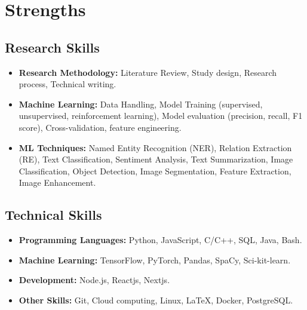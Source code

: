 \section{Strengths}
\vspace{0.3cm}

\subsection{Research Skills}

\begin{itemize}[leftmargin=.3in]
\setlength\itemsep{.1em}
    \item \textbf{Research Methodology:} Literature Review, Study design, Research process, Technical writing.

    \item \textbf{Machine Learning:} Data Handling, Model Training (supervised, unsupervised, reinforcement learning), Model evaluation (precision, recall, F1 score), Cross-validation, feature engineering.\textbf{}
    
    \item \textbf{ML Techniques:} Named Entity Recognition (NER), Relation Extraction (RE), Text Classification, Sentiment Analysis, Text Summarization, Image Classification, Object Detection, Image Segmentation, Feature Extraction, Image Enhancement.
    




    
\end{itemize}


\subsection{Technical Skills}

\begin{itemize}[leftmargin=.3in]
\setlength\itemsep{.1em}
    \item \textbf{Programming Languages:} Python, JavaScript, C/C++, SQL, Java, Bash.

    \item \textbf{Machine Learning:} TensorFlow, PyTorch, Pandas, SpaCy, Sci-kit-learn.
    
    \item \textbf{Development: } Node.js, Reactjs, Nextjs.
    
    \item \textbf{Other Skills: } Git, Cloud computing, Linux, \LaTeX, Docker, PostgreSQL.
\end{itemize}

